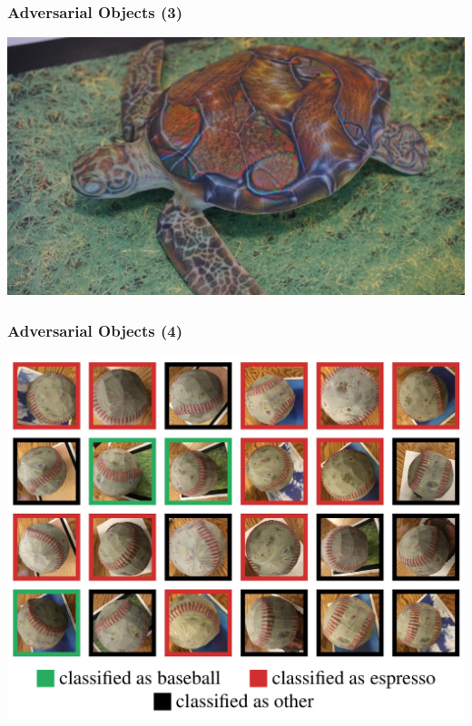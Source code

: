 \documentclass[aspectratio=169,xcolor=dvipsnames]{beamer}
\begin{document}
\begin{frame}
\frametitle{Adversarial Objects (3)}
\begin{center}
\includegraphics[height=0.7\paperheight,keepaspectratio]{images/rifle_turtle} 
\end{center}
\end{frame}

\begin{frame}
\frametitle{Adversarial Objects (4)}
\begin{center}
\includegraphics[height=0.7\paperheight,keepaspectratio]{images/baseball_class} 
\end{center}
\end{frame}
\end{document}
